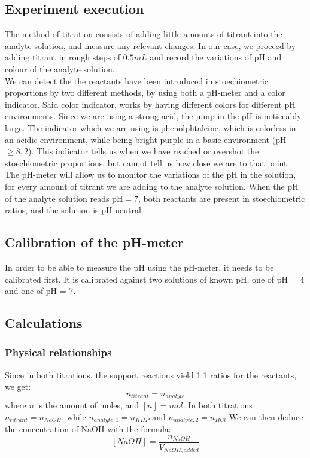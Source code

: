 \documentclass[twocolumn]{article}
\begin{document}
\subsection{Experiment execution}
The method of titration consists of adding little amounts of titrant into the analyte solution, and measure any relevant changes. In our case, we proceed by adding titrant in rough steps of $0.5mL$ and record the variations of pH and colour of the analyte solution.\\
We can detect the the reactants have been introduced in stoechiometric proportions by two different methods, by using both a pH-meter and a color indicator. Said color indicator, works by having different colors for different pH environments. Since we are using a strong acid, the jump in the pH is noticeably large. The indicator which we are using is phenolphtaleine, which is colorless in an acidic environment, while being bright purple in a basic environment (pH $\geq 8,2$). This indicator tells us when we have reached or overshot the stoechiometric proportions, but cannot tell us how close we are to that point. The pH-meter will allow us to monitor the variations of the pH in the solution, for every amount of titrant we are adding to the analyte solution. When the pH of the analyte solution reads $\text{pH} = 7$, both reactants are present in stoechiometric ratios, and the solution is pH-neutral.
\subsection{Calibration of the pH-meter}
In order to be able to measure the pH using the pH-meter, it needs to be calibrated first. It is calibrated against two solutions of known pH, one of pH = 4 and one of pH = 7.
\subsection{Calculations}
\subsubsection{Physical relationships}
Since in both titrations, the support reactions yield 1:1 ratios for the reactants, we get:
\[ n_{titrant}=n_{analyte} \] where $n$ is the amount of moles, and $[n] = mol$.
In both titrations $n_{titrant} = n_{NaOH}$, while $n_{analyte, 1} = n_{KHP}$ and $n_{analyte, 2} = n_{HCl}$
We can then deduce the concentration of NaOH with the formula:
\[ [NaOH] = \frac{n_{NaOH}}{V_{NaOH, added}}\]
\end{document}
